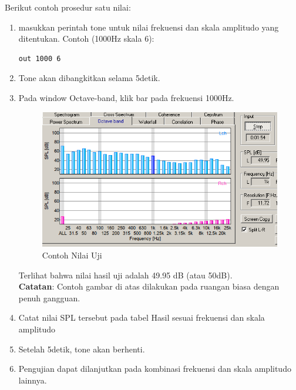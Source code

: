 \documentclass[12pt,]{article}
\begin{document}
	Berikut contoh prosedur satu nilai:
	\begin{enumerate}
		\item masukkan perintah tone untuk nilai frekuensi dan skala amplitudo yang ditentukan.
		Contoh (1000Hz skala 6):
		\begin{verbatim}
out 1000 6
		\end{verbatim}
		
		\item Tone akan dibangkitkan selama 5detik.
		
		\item Pada window Octave-band, klik bar pada frekuensi 1000Hz.
		
		\begin{figure}[!ht]
			\centering
			\includegraphics[width=300pt]{images/terminal/contoh}
			\caption{Contoh Nilai Uji}
		\end{figure}
		
		Terlihat bahwa nilai hasil uji adalah 49.95 dB (atau 50dB).\\
		\textbf{Catatan}: Contoh gambar di atas dilakukan pada ruangan biasa dengan penuh gangguan.
		
		\item Catat nilai SPL tersebut pada tabel Hasil sesuai frekuensi dan skala amplitudo
		
		\item Setelah 5detik, tone akan berhenti.
		
		\item Pengujian dapat dilanjutkan pada kombinasi frekuensi dan skala amplitudo lainnya.
	\end{enumerate}
\end{document}
